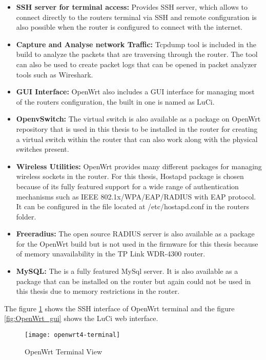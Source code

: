 \begin{itemize}
	\item \textbf{SSH server for terminal access:} Provides SSH server, which allows to connect directly to the routers terminal via SSH and remote configuration is also possible when the router is configured to connect with the internet. 
	\item \textbf{Capture and Analyse network Traffic:} Tcpdump tool is included in the build to analyze the packets that are traversing through the router. The tool can also be used to create packet logs that can be opened in packet analyzer tools such as Wireshark.
	\item \textbf{GUI Interface:} OpenWrt also includes a GUI interface for managing most of the routers configuration, the built in one is named as LuCi.
	\item \textbf{OpenvSwitch:} The virtual switch is also available as a package on OpenWrt repository that is used in this thesis to be installed in the router for creating a virtual switch within the router that can also work along with the physical switches present.
	\item \textbf{Wireless Utilities:} OpenWrt provides many different packages for managing wireless sockets in the router. For this thesis, Hostapd package is chosen because of its fully featured support for a wide range of authentication mechanisms such as IEEE 802.1x/WPA/EAP/RADIUS with EAP protocol. It can be configured in the file located at /etc/hostapd.conf in the routers folder.
	\item \textbf{Freeradius:} The open source RADIUS server is also available as a package for the OpenWrt build but is not used in the firmware for this thesis because of memory unavailability in the TP Link WDR-4300 router.
	\item \textbf{MySQL:} The is a fully featured MySql server. It is also available as a package that can be installed on the router but again could not be used in this thesis due to memory restrictions in the router.
	
\end{itemize}
The figure \ref{fig:OpenWrt_terminal} shows the SSH interface of OpenWrt terminal and the figure \ref{fig:OpenWrt_gui} shows the LuCi web interface.
\begin{figure}
	\centering
	\texttt{[image: openwrt4-terminal]}
	\caption{OpenWrt Terminal View \cite{openwrt_terminal_img}} \label{fig:OpenWrt_terminal}
	\vspace{-10pt}
\end{figure}

